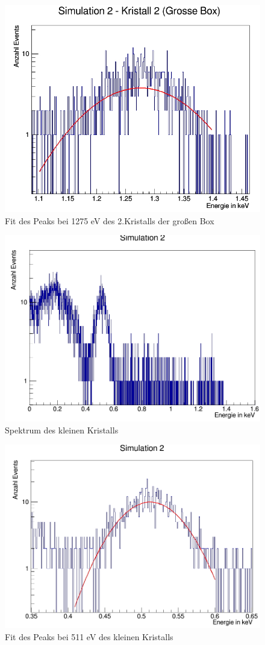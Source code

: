 \documentclass[a4paper,11pt,twoside]{article}
\begin{document}
\begin{figure}[H]
	\begin{center}
		\includegraphics[width=0.7\linewidth]{Simulation2(2KGB)_1275_fitt}
		\caption{Fit des Peaks bei 1275 eV des 2.Kristalls der großen Box}
		\label{}
	\end{center}
\end{figure}

\begin{figure}[H]
	\begin{center}
		\includegraphics[width=0.7\linewidth]{Simulation2_ganz}
		\caption{Spektrum des kleinen Kristalls}
		\label{S2_KB_ganz}
	\end{center}
\end{figure}

\begin{figure}[H]
	\begin{center}
		\includegraphics[width=0.7\linewidth]{Simulation2_511_fit}
		\caption{Fit des Peaks bei 511 eV des kleinen Kristalls}
		\label{}
	\end{center}
\end{figure}
\end{document}
